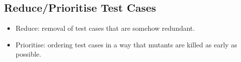 
\subsection{Reduce/Prioritise Test Cases}
\label{sub:reduceprioritise}

\begin{itemize}
	\item Reduce: removal of test cases that are somehow redundant.
	\item Prioritise: ordering test cases in a way that mutants are killed as early as possible.
\end{itemize}

